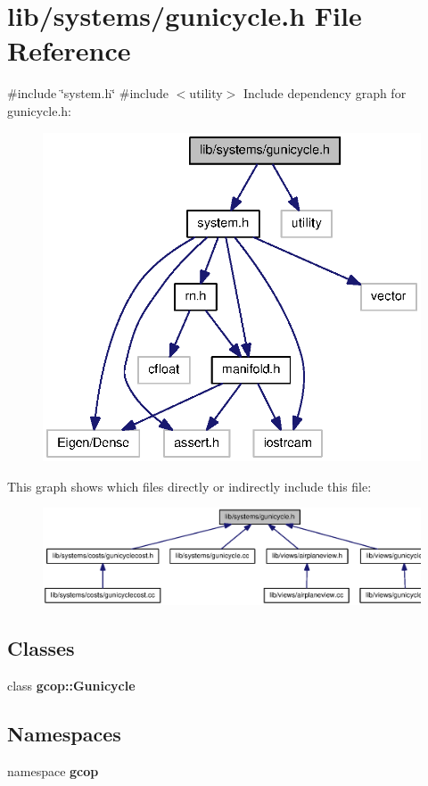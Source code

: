 \section{lib/systems/gunicycle.h \-File \-Reference}
\label{gunicycle_8h}
{\ttfamily \#include \char`\"{}system.\-h\char`\"{}}\*
{\ttfamily \#include $<$utility$>$}\*
\-Include dependency graph for gunicycle.\-h\-:\nopagebreak
\begin{figure}[H]
\begin{center}
\leavevmode
\includegraphics[width=336pt]{gunicycle_8h__incl}
\end{center}
\end{figure}
\-This graph shows which files directly or indirectly include this file\-:\nopagebreak
\begin{figure}[H]
\begin{center}
\leavevmode
\includegraphics[width=350pt]{gunicycle_8h__dep__incl}
\end{center}
\end{figure}
\subsection*{\-Classes}
\begin{DoxyCompactItemize}
\item 
class {\bf gcop\-::\-Gunicycle}
\end{DoxyCompactItemize}
\subsection*{\-Namespaces}
\begin{DoxyCompactItemize}
\item 
namespace {\bf gcop}
\end{DoxyCompactItemize}

